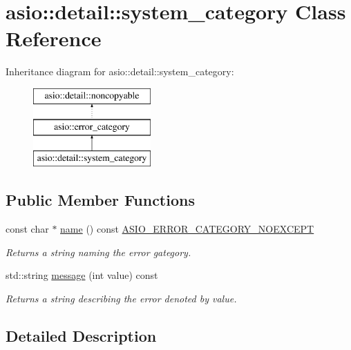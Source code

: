 \hypertarget{classasio_1_1detail_1_1system__category}{}\section{asio\+:\+:detail\+:\+:system\+\_\+category Class Reference}
\label{classasio_1_1detail_1_1system__category}
Inheritance diagram for asio\+:\+:detail\+:\+:system\+\_\+category\+:\begin{figure}[H]
\begin{center}
\leavevmode
\includegraphics[height=3.000000cm]{classasio_1_1detail_1_1system__category}
\end{center}
\end{figure}
\subsection*{Public Member Functions}
\begin{DoxyCompactItemize}
\item 
const char $\ast$ \hyperlink{classasio_1_1detail_1_1system__category_aec2905c994346579573ce74a33256553}{name} () const \hyperlink{config_8hpp_a1e51af6137c0e4e4d686921037649e74}{A\+S\+I\+O\+\_\+\+E\+R\+R\+O\+R\+\_\+\+C\+A\+T\+E\+G\+O\+R\+Y\+\_\+\+N\+O\+E\+X\+C\+E\+P\+T}
\begin{DoxyCompactList}\small\item\em Returns a string naming the error gategory. \end{DoxyCompactList}\item 
std\+::string \hyperlink{classasio_1_1detail_1_1system__category_a951ddd446aa37b42de22ff7bd36df781}{message} (int value) const 
\begin{DoxyCompactList}\small\item\em Returns a string describing the error denoted by {\ttfamily value}. \end{DoxyCompactList}\end{DoxyCompactItemize}


\subsection{Detailed Description}


